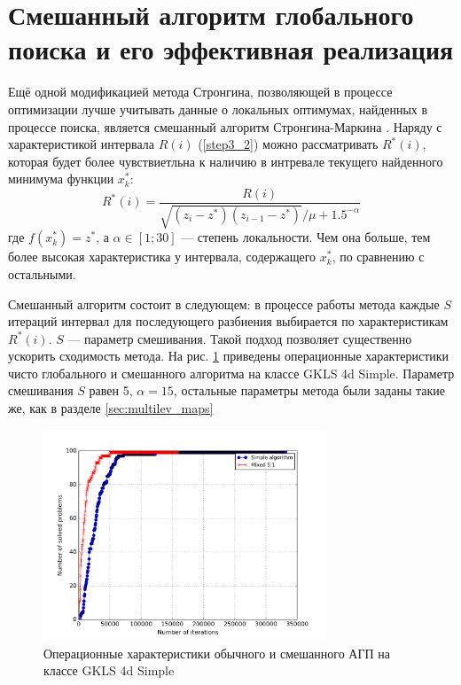 \section{Смешанный алгоритм глобального поиска и его эффективная реализация}
Ещё одной модификацией метода Стронгина, позволяющей в процессе оптимизации лучше учитывать данные о локальных оптимумах, найденных в процессе поиска, является смешанный алгоритм Стронгина-Маркина \cite{mixedAlg}.
Наряду с характеристикой интервала \(R(i)\) (\ref{step3_2}) можно рассматривать \(R^*(i)\), которая будет более чувствиетльна к наличию в интревале текущего найденного минимума функции \(x_k^*\):
\begin{displaymath}
R^*(i)=\frac{R(i)}{\sqrt{(z_i-z^*)(z_{i-1}-z^*)}/\mu + 1.5^{-\alpha}}
\end{displaymath}
где \(f(x_k^*)=z^*\), а \(\alpha \in [1;30]\) --- степень локальности. Чем она больше, тем более высокая характеристика у интервала, содержащего \(x_k^*\), по сравнению с остальными.
\par
Смешанный алгоритм состоит в следующем: в процессе работы метода каждые \(S\) итераций интервал для последующего разбиения выбирается по характеристикам \(R^*(i)\). \(S\) --- параметр смешивания.
Такой подход позволяет существенно ускорить сходимость метода. На рис. \ref{fig:localMixOP4d} приведены операционные характеристики чисто глобального и смешанного алгоритма на классе GKLS 4d Simple.
Параметр смешивания \(S\) равен 5, \(\alpha=15\), остальные параметры метода были заданы такие же, как в разделе \ref{sec:multilev_maps}
\begin{figure}[ht]
	\center
  \includegraphics[width=0.75\textwidth]{pictures/mixed_op4d.png}
  \caption{Операционные характеристики обычного и смешанного АГП на классе GKLS 4d Simple}
  \label{fig:localMixOP4d}
\end{figure}
